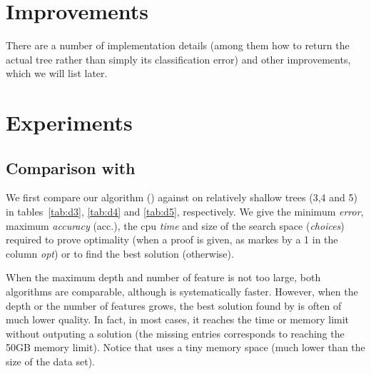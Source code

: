 \documentclass{article}
\DeclareMathOperator*{\argmin}{arg\,min}
\newcommand{\tru}[0]{\texttt{true}}
\newcommand{\fal}[0]{\texttt{false}}
\newcommand{\setex}[1]{\ensuremath{{\mathcal X}^{#1}}\xspace}
\newcommand{\posex}{{\setex{\top}}\xspace}
\newcommand{\negex}{{\setex{\bot}}\xspace}
\newcommand{\nodes}[0]{\ensuremath{{\cal N}}}
\newcommand{\bud}[0]{\ensuremath{{\cal B}}}
\newcommand{\sequence}[0]{\ensuremath{{\cal S}}}
\newcommand{\bnode}[0]{\ensuremath{b}}
\newcommand{\depth}[1][]{\ensuremath{\ifthenelse{\equal{#1}{}}{depth}{depth({#1})}}}
\newcommand{\test}[1][]{\ensuremath{\ifthenelse{\equal{#1}{}}{test}{test({#1})}}}
\newcommand{\child}[1][]{\ensuremath{\ifthenelse{\equal{#1}{}}{{child}}{{child({{#1}})}}}}
\newcommand{\error}[1][]{\ensuremath{\ifthenelse{\equal{#1}{}}{{error}}{{error({{#1}})}}}}
\begin{document}
%


\section*{Improvements}

There are a number of implementation details (among them how to return the actual tree rather than simply its classification error) and other improvements, which we will list later.



\section*{Experiments}

\subsection*{Comparison with \dleight}

We first compare our algorithm (\budalg) against \dleight on relatively shallow trees (3,4 and 5) in tables~\ref{tab:d3}, \ref{tab:d4} and \ref{tab:d5}, respectively. 
We give the minimum \emph{error}, maximum \emph{accuracy} (acc.), the cpu \emph{time} and size of the search space (\emph{choices}) required to prove optimality (when a proof is given, as markes by a 1 in the column \emph{opt}) or to find the best solution (otherwise).

\medskip

When the maximum depth and number of feature is not too large, both algorithms are comparable, although \budalg is systematically faster. However, when the depth or the number of features grows, the best solution found by \dleight is often of much lower quality. In fact, in most cases, it reaches the time or memory limit without outputing a solution (the missing entries corresponds to \dleight reaching the 50GB memory limit). Notice that \budalg uses a tiny memory space (much lower than the size of the data set).
\end{document}
